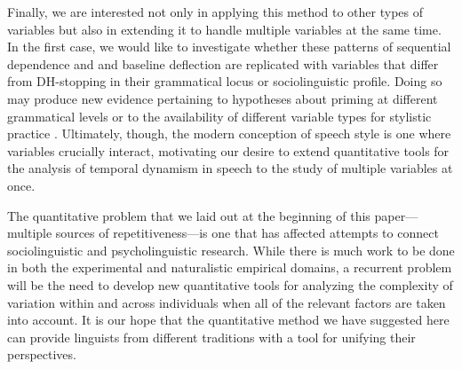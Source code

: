 \documentclass[12pt]{article}
\begin{document}
Finally, we are interested not only in applying this method to other types of variables but also in extending it to handle multiple variables at the same time. In the first case, we would like to investigate whether these patterns of sequential dependence and and baseline deflection are replicated with variables that differ from DH-stopping in their grammatical locus or sociolinguistic profile. Doing so may produce  new evidence pertaining to hypotheses about priming at different grammatical levels \citep{Tamminga:2014b} or to the availability of different variable types for stylistic practice \citep{Labov:1994}. Ultimately, though, the modern conception of speech style is one where variables crucially interact, motivating our desire to extend quantitative tools for the analysis of temporal dynamism in speech to the study of multiple variables at once.

The quantitative problem that we laid out at the beginning of this paper---multiple sources of repetitiveness---is one that has affected attempts to connect sociolinguistic and psycholinguistic research. While there is much work to be done in both the experimental and naturalistic empirical domains, a recurrent problem will be the need to develop new quantitative tools for analyzing the complexity of variation within and across individuals when all of the relevant factors are taken into account. It is our hope that the quantitative method we have suggested here can provide linguists from different traditions with a tool for unifying their perspectives.

%


\end{document}
